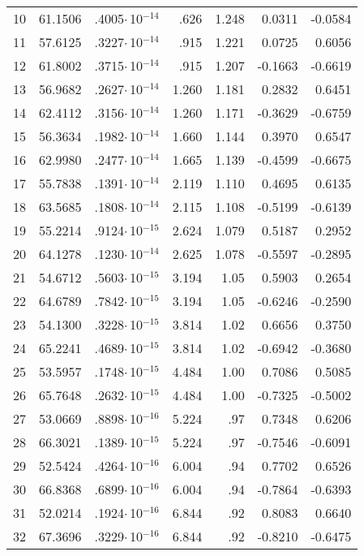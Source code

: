 \begin{longtable}{|l||r|r|r|r|r|r|}
10 & 61.1506 & .4005$\cdot$\,10$^{-14}$ & .626 & 1.248 & 0.0311 & -0.0584 \\
11 & 57.6125 & .3227$\cdot$\,10$^{-14}$ & .915 & 1.221 & 0.0725 & 0.6056 \\
12 & 61.8002 & .3715$\cdot$\,10$^{-14}$ & .915 & 1.207 & -0.1663 & -0.6619 \\
13 & 56.9682 & .2627$\cdot$\,10$^{-14}$ & 1.260 & 1.181 & 0.2832 & 0.6451 \\
14 & 62.4112 & .3156$\cdot$\,10$^{-14}$ & 1.260 & 1.171 & -0.3629 & -0.6759 \\
15 & 56.3634 & .1982$\cdot$\,10$^{-14}$ & 1.660 & 1.144 & 0.3970 &  0.6547 \\
16 & 62.9980 & .2477$\cdot$\,10$^{-14}$ & 1.665 & 1.139 & -0.4599 & -0.6675 \\
17 & 55.7838 & .1391$\cdot$\,10$^{-14}$ & 2.119 & 1.110 & 0.4695 & 0.6135 \\
18 & 63.5685 & .1808$\cdot$\,10$^{-14}$ & 2.115 & 1.108 & -0.5199 & -0.6139 \\
19 & 55.2214 & .9124$\cdot$\,10$^{-15}$ & 2.624 & 1.079 & 0.5187 & 0.2952 \\
20 & 64.1278 & .1230$\cdot$\,10$^{-14}$ & 2.625 & 1.078 & -0.5597 & -0.2895 \\
21 & 54.6712 & .5603$\cdot$\,10$^{-15}$ & 3.194 & 1.05 & 0.5903 & 0.2654 \\
22 & 64.6789 & .7842$\cdot$\,10$^{-15}$ & 3.194 & 1.05 & -0.6246 & -0.2590 \\
23 & 54.1300 & .3228$\cdot$\,10$^{-15}$ & 3.814 & 1.02 & 0.6656 & 0.3750 \\
24 & 65.2241 & .4689$\cdot$\,10$^{-15}$ & 3.814 & 1.02 & -0.6942 & -0.3680 \\
25 & 53.5957 & .1748$\cdot$\,10$^{-15}$ & 4.484 & 1.00 & 0.7086 & 0.5085 \\
26 & 65.7648 & .2632$\cdot$\,10$^{-15}$ & 4.484 & 1.00 & -0.7325 & -0.5002 \\
27 & 53.0669 & .8898$\cdot$\,10$^{-16}$ & 5.224 & .97 & 0.7348 & 0.6206 \\
28 & 66.3021 & .1389$\cdot$\,10$^{-15}$ & 5.224 & .97 & -0.7546 & -0.6091 \\
29 & 52.5424 & .4264$\cdot$\,10$^{-16}$ & 6.004 & .94 & 0.7702 & 0.6526 \\
30 & 66.8368 & .6899$\cdot$\,10$^{-16}$ & 6.004 & .94 & -0.7864 & -0.6393 \\
31 & 52.0214 & .1924$\cdot$\,10$^{-16}$ & 6.844 & .92 & 0.8083 & 0.6640 \\
32 & 67.3696 & .3229$\cdot$\,10$^{-16}$ & 6.844 & .92 & -0.8210 & -0.6475 \\

\end{longtable}
